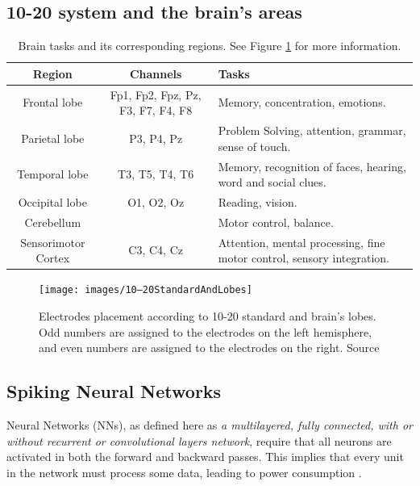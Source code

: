 		\subsection{10-20 system and the brain's areas}
		\begin{table}[H]
			\begin{center}
				\caption{Brain tasks and its corresponding regions. See Figure \ref{fig:1020standardandlobes} for more information.}
				\begin{tabular}{|c|c|p{}|}
					\hline
					Region & Channels & Tasks\\
					\hline
					Frontal lobe & Fp1, Fp2, Fpz, Pz, F3, F7, F4, F8 & Memory, concentration, emotions.\\
					\hline
					Parietal lobe& P3, P4, Pz & Problem Solving, attention, grammar, sense of touch. \\
					\hline
					Temporal lobe& T3, T5, T4, T6 & Memory, recognition of faces, hearing, word and social clues. \\
					\hline
					Occipital lobe & O1, O2, Oz & Reading, vision.\\
					\hline
					Cerebellum && Motor control, balance. \\
					\hline
					Sensorimotor Cortex & C3, C4, Cz& Attention, mental processing, ﬁne motor control, sensory integration. \\
					\hline
				\end{tabular}
				\label{tb:brainRegions}
			\end{center}
		\end{table}
		
		\begin{figure}[H]
			\centering
			\texttt{[image: images/10–20StandardAndLobes]}
			\caption[10-20 standard and brain lobes]{Electrodes placement according to 10-20 standard \cite{sistema10-20} and brain's lobes. Odd numbers are assigned to the electrodes on the left hemisphere, and even numbers are assigned to the electrodes on the right. Source \cite{JALALYBIDGOLY2020101788}}
			\label{fig:1020standardandlobes}
		\end{figure}
	
	\subsection{Spiking Neural Networks}
		\par Neural Networks (NNs), as defined here as \textit{a multilayered, fully connected, with or without recurrent or convolutional layers network}, require that all neurons are activated in both the forward and backward passes. This implies that every unit in the network must process some data, leading to power consumption \cite{10242251}. 
		
